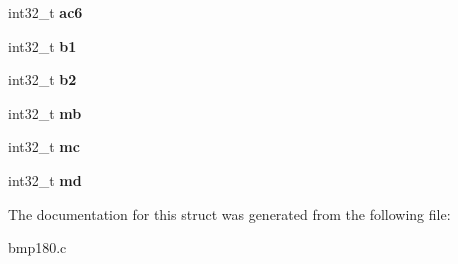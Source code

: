 \begin{DoxyCompactItemize}
\item 
\hypertarget{structbmp180__t_aa14231d84bc8237916cfcbb25ae0cc08}{int32\+\_\+t {\bfseries ac6}}\label{structbmp180__t_aa14231d84bc8237916cfcbb25ae0cc08}

\item 
\hypertarget{structbmp180__t_a224f652d2c6e35d203e8444f4a77dbb7}{int32\+\_\+t {\bfseries b1}}\label{structbmp180__t_a224f652d2c6e35d203e8444f4a77dbb7}

\item 
\hypertarget{structbmp180__t_a70ba8fd171c652ea73dccf116b9f32bb}{int32\+\_\+t {\bfseries b2}}\label{structbmp180__t_a70ba8fd171c652ea73dccf116b9f32bb}

\item 
\hypertarget{structbmp180__t_a1db8c9fc0274f79657526119eb7fe803}{int32\+\_\+t {\bfseries mb}}\label{structbmp180__t_a1db8c9fc0274f79657526119eb7fe803}

\item 
\hypertarget{structbmp180__t_a411d7df2c3f466cd048e384d01ddfe50}{int32\+\_\+t {\bfseries mc}}\label{structbmp180__t_a411d7df2c3f466cd048e384d01ddfe50}

\item 
\hypertarget{structbmp180__t_a776459c350aa62fdd10380a925108985}{int32\+\_\+t {\bfseries md}}\label{structbmp180__t_a776459c350aa62fdd10380a925108985}

\end{DoxyCompactItemize}


The documentation for this struct was generated from the following file\+:\begin{DoxyCompactItemize}
\item 
bmp180.\+c\end{DoxyCompactItemize}
